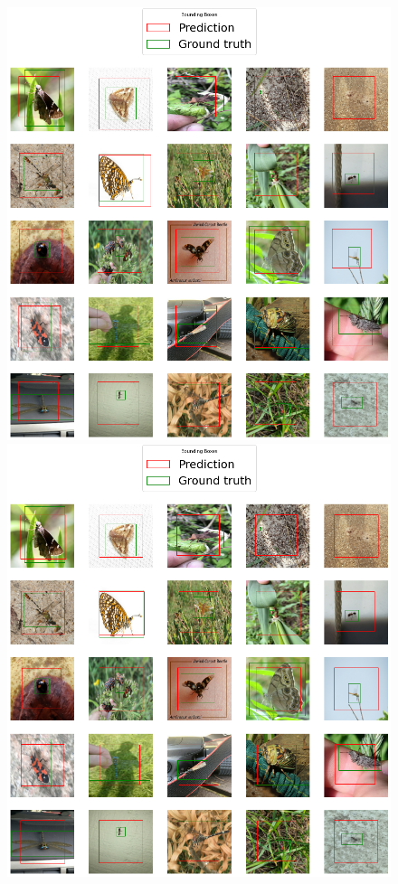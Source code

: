 \begin{figure}
\begin{multicols}{2}
\begin{minipage}{.45\textwidth}
            \includegraphics[width=\textwidth]{images/augmented-regression-inet.png}
        \end{minipage}
    \end{multicols}
    \begin{multicols}{2}
        \begin{minipage}{.45\textwidth}
            \includegraphics[width=\textwidth]{images/regression-mobilenet.png}

\end{minipage}
\end{multicols}
\end{figure}
